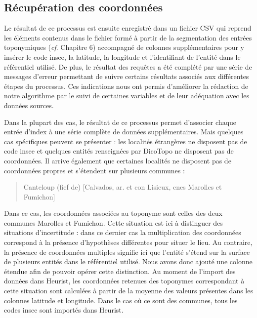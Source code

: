 \documentclass[a4paper,12pt,twoside]{book}
\begin{document}
	\subsection{Récupération des coordonnées}
	
	Le résultat de ce processus est ensuite enregistré dans un fichier CSV qui reprend les éléments contenus dans le fichier formé à partir de la segmentation des entrées toponymiques (\textit{cf}. Chapitre 6) accompagné de colonnes supplémentaires pour y insérer le code insee, la latitude, la longitude et l'identifiant de l'entité dans le référentiel utilisé. De plus, le résultat des requêtes a été complété par une série de messages d'erreur permettant de suivre certains résultats associés aux différentes étapes du processus. Ces indications nous ont permis d'améliorer la rédaction de notre algorithme par le suivi de certaines variables et de leur adéquation avec les données sources.
	
	Dans la plupart des cas, le résultat de ce processus permet d'associer chaque entrée d'index à une série complète de données supplémentaires. Mais quelques cas spécifiques peuvent se présenter : les localités étrangères ne disposent pas de code insee et quelques entités renseignées par DicoTopo ne disposent pas de coordonnées. Il arrive également que certaines localités ne disposent pas de coordonnées propres et s'étendent sur plusieurs communes :
	
	\begin{quotation}
		Canteloup (fief de) [Calvados, ar. et con Lisieux, cnes Marolles et Fumichon]
	\end{quotation}

	Dans ce cas, les coordonnées associées au toponyme sont celles des deux communes Marolles et Fumichon. Cette situation est ici à distinguer des situations d'incertitude : dans ce dernier cas la multiplication des coordonnées correspond à la présence d'hypothèses différentes pour situer le lieu. Au contraire, la présence de coordonnées multiples signifie ici que l'entité s'étend sur la surface de plusieurs entités dans le référentiel utilisé. Nous avons donc ajouté une colonne \og étendue\fg{} afin de pouvoir opérer cette distinction. Au moment de l'import des données dans Heurist, les coordonnées retenues des toponymes correspondant à cette situation sont calculées à partir de la moyenne des valeurs présentes dans les colonnes \og latitude\fg{} et \og longitude\fg{}. Dans le cas où ce sont des communes, tous les codes insee sont importés dans Heurist.
	
\end{document}
